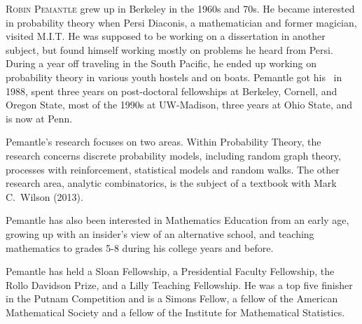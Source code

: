 \documentclass{toc}
\begin{document}
\begin{tocaboutauthors}
\begin{tocabout}[mossel]
\end{tocabout}
%
\begin{tocabout}[pemantle]
\textsc{Robin Pemantle} grew up in Berkeley in the 
%
1960s and 70s.   %
He became interested in probability theory when Persi Diaconis, 
a mathematician and former magician, visited M.I.T.  He was 
supposed to be working on a dissertation in another subject,
but found himself working mostly on problems he heard from Persi.
During a year off traveling in the South Pacific, he ended up
working on probability theory in various youth hostels and on boats.
Pemantle got his \phd\ in 1988, spent three years on post-doctoral 
fellowships %
%
%
%
at Berkeley, Cornell, and Oregon State,  %
most of the 
%
1990s      %
at UW-Madison, three years at Ohio State, 
and is now at Penn.

\noindent
Pemantle's research focuses on two areas.  Within Probability Theory,
the research concerns discrete probability models, including
random graph theory, processes with reinforcement, statistical
models and random walks.  The other research area, analytic combinatorics,
is the subject of a textbook with Mark C.\ Wilson (2013).

\noindent
Pemantle has also been interested in Mathematics Education from
an early age, growing up with an insider's view of an alternative 
school, and teaching mathematics to grades 5-8 during his college
years and before.

\noindent
Pemantle has held a Sloan Fellowship, a Presidential Faculty Fellowship,
the Rollo Davidson Prize, and a Lilly Teaching Fellowship.  He was a
top five finisher in the Putnam Competition and is a Simons Fellow, 
a fellow of the American Mathematical Society and a fellow of the 
Institute for Mathematical Statistics. 
\end{tocabout}
\end{tocaboutauthors}
\end{document}
